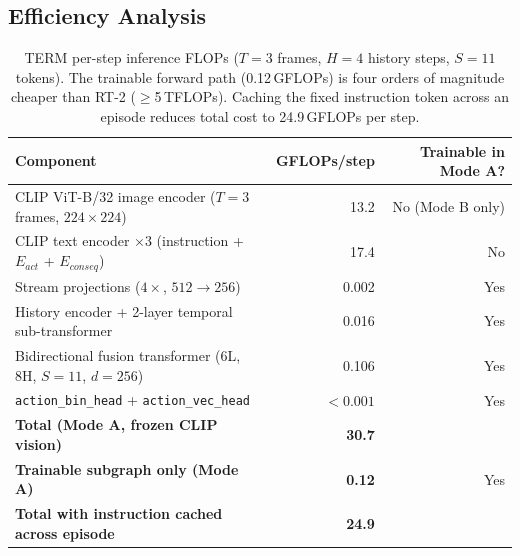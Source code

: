 \documentclass[letterpaper]{article} %
\begin{document}
\subsection{Efficiency Analysis}

\begin{table}[t]
\centering
\setlength{\tabcolsep}{4pt}
\small
\begin{tabular}{lrr}
\toprule
\textbf{Component} & \textbf{GFLOPs/step} & \textbf{Trainable in Mode A?} \\
\midrule
CLIP ViT-B/32 image encoder ($T{=}3$ frames, $224{\times}224$) & 13.2 & No (Mode B only) \\
CLIP text encoder $\times$3 (instruction + $E_{act}$ + $E_{conseq}$) & 17.4 & No \\
\midrule
Stream projections ($4\times$, $512{\to}256$) & 0.002 & Yes \\
History encoder + 2-layer temporal sub-transformer & 0.016 & Yes \\
Bidirectional fusion transformer (6L, 8H, $S{=}11$, $d{=}256$) & 0.106 & Yes \\
\texttt{action\_bin\_head} + \texttt{action\_vec\_head} & ${<}0.001$ & Yes \\
\midrule
\textbf{Total (Mode A, frozen CLIP vision)} & \textbf{30.7} & \\
\textbf{Trainable subgraph only (Mode A)} & \textbf{0.12} & Yes \\
\textbf{Total with instruction cached across episode} & \textbf{24.9} & \\
\bottomrule
\end{tabular}
\caption{TERM per-step inference FLOPs ($T{=}3$ frames, $H{=}4$ history steps, $S{=}11$ tokens). The trainable forward path (0.12\,GFLOPs) is four orders of magnitude cheaper than RT-2 (${\ge}$5\,TFLOPs). Caching the fixed instruction token across an episode reduces total cost to 24.9\,GFLOPs per step.}
\label{tab:flops}
\end{table}
\end{document}
